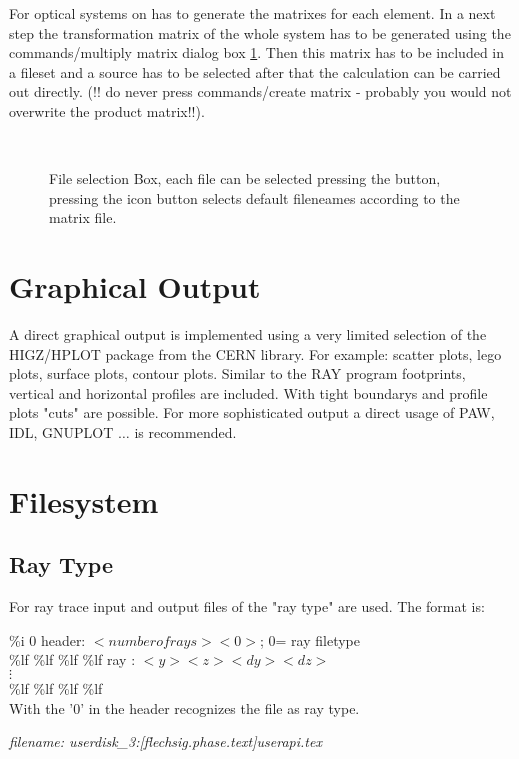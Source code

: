 For optical systems on has to generate the matrixes for each element. In a next
step the transformation matrix of the whole system has to be generated using
the commands/multiply matrix dialog box \ref {mbox}. Then this matrix has to be
included in a fileset and a source has to be selected after that the
calculation can be carried out directly. (!! do never press commands/create 
matrix - probably you would not overwrite the product matrix!!). 

\begin{figure}
\centerline{ \hbox{
 }}  
  \caption {\label{mbox} File selection Box, each file can be selected
pressing the button, pressing the icon button selects default fileneames
according to the matrix file.} 
\end {figure}    



\section{Graphical Output}
A direct graphical output is implemented using a very limited selection
of the HIGZ/HPLOT package from the CERN library. For example: scatter plots,
lego plots, surface plots, contour plots. Similar to the RAY program
footprints, vertical and horizontal profiles are included. With tight
boundarys and profile plots  "cuts" are possible.
For more sophisticated output
a direct usage of PAW, IDL, GNUPLOT $\ldots$ is recommended.


\section {Filesystem}

\subsection {Ray Type}
 
For ray trace input and output files of the "ray type" are used. The 
format is:

\%i 0                  header: $<number of rays> <0>$; 0= ray filetype \\
\%lf \%lf \%lf \%lf       ray : $<y> <z> <dy> <dz> $        \\
 $\vdots$                                                  \\
\%lf \%lf \%lf \%lf        \\

With the  '0' in the header  \phase recognizes the file as ray type.
 

{\it filename: userdisk\_3:[flechsig.phase.text]userapi.tex}  

